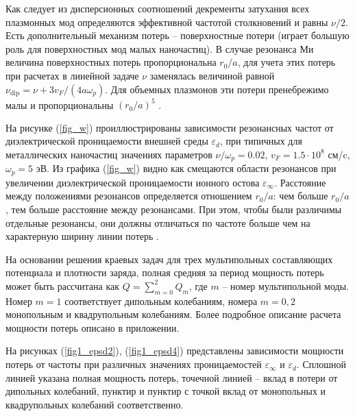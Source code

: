 \documentclass[12pt, a4paper]{article}
\def \eps {\varepsilon}
\def \w {\omega}
\newcommand{\op}[1]{\operatorname {#1}}
\begin{document}
Как следует из дисперсионных соотношений декременты затухания всех плазмонных мод определяются эффективной частотой столкновений и равны $\nu/2$. 
Есть дополнительный механизм потерь -- поверхностные потери (играет большую роль для поверхностных мод малых наночастиц).
В случае резонанса Ми величина поверхностных потерь пропорциональна  $r_0/a$, для учета этих потерь при расчетах в линейной задаче  $\nu$ заменялась величиной равной $\nu_{\op{dip}} = \nu + 3 v_F / (4a  \w_p)$.
Для объемных плазмонов эти потери пренебрежимо малы и пропорциональны $(r_0/a)^5$ \cite{Hovel1993}.



На рисунке (\ref{fig_w}) проиллюстрированы зависимости резонансных частот от диэлектрической проницаемости внешней среды $\eps_d$, при типичных для металлических наночастиц значениях параметров $\nu / \w_p = 0.02$, $v_F = 1.5 \cdot 10^8$ см/c, $\w_p = 5$ эВ. Из графика (\ref{fig_w}) видно как смещаются области резонансов при увеличении диэлектрической проницаемости ионного остова $\eps_\infty$. Расстояние между положениями резонансов определяется отношением $r_0/a$: чем больше $r_0/a$, тем больше расстояние между резонансами. При этом, чтобы были различимы отдельные резонансы, они должны отличаться по частоте больше чем на характерную ширину линии потерь .

На основании решения краевых задач для трех мультипольных составляющих потенциала и плотности заряда, полная средняя за период мощность потерь может быть рассчитана как $Q = \sum_{m=0}^2 Q_m$, где $m$ -- номер мультипольной моды. Номер $m=1$ соответствует дипольным колебаниям, номера $m=0,2$ монопольным и квадрупольным колебаниям. Более подробное описание расчета мощности потерь описано в приложении. 

На рисунках (\ref{fig1_epsd2}), (\ref{fig1_epsd4}) представлены зависимости мощности потерь от частоты при различных значениях проницаемостей $\eps_\infty$ и $\eps_d$. Сплошной линией указана полная мощность потерь, точечной линией – вклад в потери от дипольных колебаний, пунктир и пунктир с точкой вклад от монопольных и квадрупольных колебаний соответственно. 
\end{document}
